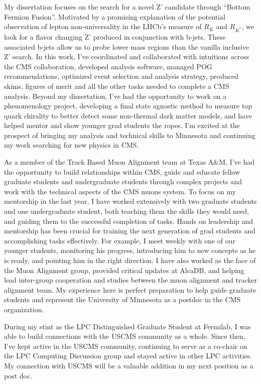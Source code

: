 \documentclass[11pt]{article}
\begin{document}
My dissertation focuses on the search for a novel Z' candidate through “Bottom Fermion Fusion”. Motivated by a promising explanation of the potential observation of lepton non-universality in the LHCb’s measure of $R_{K}$ and $R_{K^*}$, we look for a flavor changing Z' produced in conjunction with b-jets. These associated b-jets allow us to probe lower mass regions than the vanilla inclusive Z' search. In this work, I've coordinated and collaborated with intuitions across the CMS collaboration, developed analysis software, managed POG recommendations, optimized event selection and analysis strategy, produced skims, figures of merit and all the other tasks needed to complete a CMS analysis. Beyond my dissertation, I've had the opportunity to work on a phenomenology project, developing a final state agnostic method to measure top quark chirality to better detect some non-thermal dark matter models, and have helped mentor and show younger grad students the ropes. I'm excited at the prospect of bringing my analysis and technical skills to Minnesota and continuing my work searching for new physics in CMS. 


As a member of the Track Based Muon Alignment team at Texas A\&M, I've had the opportunity to build relationships within CMS, guide and educate fellow graduate students and undergraduate students through complex projects and work with the technical aspects of the CMS muons system. To focus on my mentorship in the last year, I have worked extensively with two graduate students and one undergraduate student, both teaching them the skills they would need, and guiding them to the successful completion of tasks. Hands on leadership and mentorship has been crucial for training the next generation of grad students and accomplishing tasks effectively. For example, I meet weekly with one of our younger students, monitoring his progress, introducing him to new concepts as he is ready, and pointing him in the right direction. I have also worked as the face of the Muon Alignment group, provided critical updates at AlcaDB, and helping lead inter-group cooperation and studies between the muon alignment and tracker alignment team. My experience here is perfect preparation to help guide graduate students and represent the University of Minnesota as a postdoc in the CMS organization. 

During my stint as the LPC Distinguished Graduate Student at Fermilab, I was able to build connections with the USCMS community as a whole. Since then, I've kept active in the USCMS community, continuing to serve as a co-chair on the LPC Computing Discussion group and stayed active in other LPC activities. My connection with USCMS will be a valuable addition in my next position as a post doc. 
\end{document}
